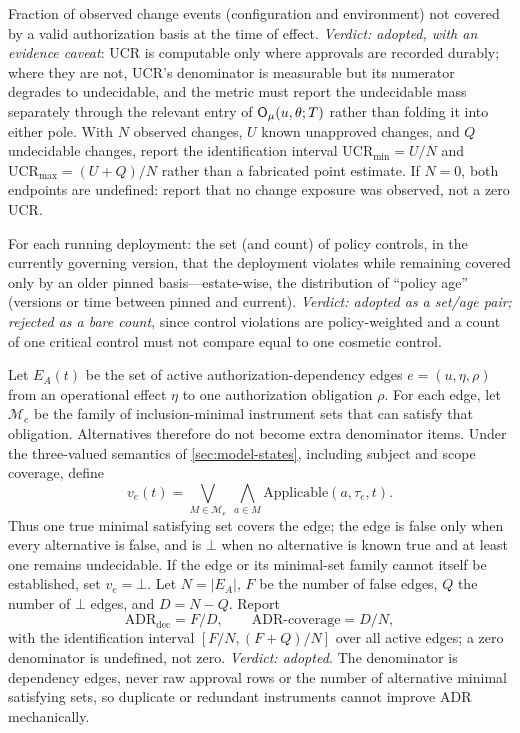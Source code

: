 \begin{metricdef}
\label{met:ucr}
Fraction of observed change events (configuration and environment) not
covered by a valid authorization basis at the time of effect. \emph{Verdict:
adopted, with an evidence caveat}: UCR is computable only where approvals are
recorded durably; where they are not, UCR's denominator is measurable but its
numerator degrades to undecidable, and the metric must report the undecidable
mass separately through the relevant entry of
$\mathsf{O}_{\mu}(u,\theta;T)$ rather than folding it into either pole.
With $N$ observed changes, $U$ known unapproved changes, and $Q$
undecidable changes, report the identification interval
$\mathrm{UCR}_{\min}=U/N$ and
$\mathrm{UCR}_{\max}=(U+Q)/N$ rather than a fabricated point estimate. If
$N=0$, both endpoints are undefined: report that no change exposure was
observed, not a zero UCR.
\end{metricdef}

\begin{metricdef}
\label{met:pvd}
For each running deployment: the set (and count) of policy controls, in the
currently governing version, that the deployment violates while remaining
covered only by an older pinned basis---estate-wise, the distribution of
``policy age'' (versions or time between pinned and current). \emph{Verdict:
adopted as a set/age pair; rejected as a bare count}, since control
violations are policy-weighted and a count of one critical control must not
compare equal to one cosmetic control.
\end{metricdef}

\begin{metricdef}
\label{met:adr}
Let $E_A(t)$ be the set of active authorization-dependency edges
$e=(u,\eta,\rho)$ from an operational effect $\eta$ to one authorization
obligation $\rho$. For each edge, let $\mathcal M_e$ be the family of
inclusion-minimal instrument sets that can satisfy that obligation. Alternatives
therefore do not become extra denominator items. Under the three-valued
semantics of \cref{sec:model-states}, including subject and scope coverage,
define
\[
v_e(t)=\bigvee_{M\in\mathcal M_e}\ \bigwedge_{a\in M}
\mathrm{Applicable}(a,\tau_e,t).
\]
Thus one true minimal satisfying set covers the edge; the edge is false only
when every alternative is false, and is $\bot$ when no alternative is known
true and at least one remains undecidable. If the edge or its minimal-set
family cannot itself be established, set $v_e=\bot$. Let $N=|E_A|$, $F$ be the number
of false edges, $Q$ the number of $\bot$ edges, and $D=N-Q$. Report
\[
\mathrm{ADR}_{\mathrm{dec}}=F/D,\qquad
\mathrm{ADR\mbox{-}coverage}=D/N,
\]
with the identification interval
$[F/N,(F+Q)/N]$ over all active edges; a zero denominator is undefined, not
zero. \emph{Verdict: adopted.} The denominator is dependency edges, never raw
approval rows or the number of alternative minimal satisfying sets, so
duplicate or redundant instruments cannot improve ADR mechanically.
\end{metricdef}

